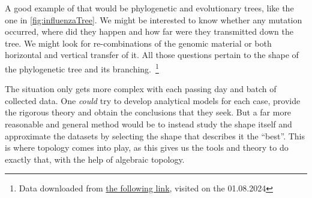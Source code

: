 A good example of that would be phylogenetic and evolutionary trees, like the one in \ref{fig:influenzaTree}. We might be interested to know whether any mutation occurred, where did they happen and how far were they transmitted down the tree. We might look for re-combinations of the genomic material or both horizontal and vertical transfer of it. All those questions pertain to the shape of the phylogenetic tree and its branching.\
\footnote{Data downloaded from \href{https://datadryad.org/stash/dataset/doi:10.5061/dryad.v15v0}{the following link},
visited on the 01.08.2024}
\par
The situation only gets more complex with each passing day and batch of collected data. One \textit{could} try to develop analytical models for each case, provide the rigorous theory and obtain the conclusions that they seek. But a far more reasonable and general method would be to instead study the shape itself and approximate the datasets by selecting the shape that describes it the ``best''. This is where topology comes into play, as this gives us the tools and theory to do exactly that, with the help of algebraic topology.
